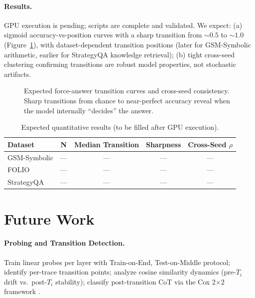 \documentclass[11pt]{article}
\begin{document}
\paragraph{Results.}
GPU execution is pending; scripts are complete and validated. We expect: (a) sigmoid accuracy-vs-position curves with a sharp transition from ${\sim}0.5$ to ${\sim}1.0$ (Figure~\ref{fig:transition}), with dataset-dependent transition positions (later for GSM-Symbolic arithmetic, earlier for StrategyQA knowledge retrieval); (b) tight cross-seed clustering confirming transitions are robust model properties, not stochastic artifacts.

\begin{figure}[t]
  \centering
  \caption{Expected force-answer transition curves and cross-seed consistency. Sharp transitions from chance to near-perfect accuracy reveal when the model internally ``decides'' the answer.}
  \label{fig:transition}
\end{figure}

\begin{table}[t]
  \centering
  \small
  \caption{Expected quantitative results (to be filled after GPU execution).}
  \label{tab:results}
  \begin{tabular}{lcccc}
    \toprule
    Dataset & N & Median Transition & Sharpness & Cross-Seed $\rho$ \\
    \midrule
    GSM-Symbolic & --- & --- & --- & --- \\
    FOLIO        & --- & --- & --- & --- \\
    StrategyQA   & --- & --- & --- & --- \\
    \bottomrule
  \end{tabular}
\end{table}

\section{Future Work}

\paragraph{Probing and Transition Detection.} Train linear probes per layer with Train-on-End, Test-on-Middle protocol; identify per-trace transition points; analyze cosine similarity dynamics (pre-$T_i$ drift vs.\ post-$T_i$ stability); classify post-transition CoT via the Cox 2$\times$2 framework \citep{cox2025posthoc}.
\end{document}
